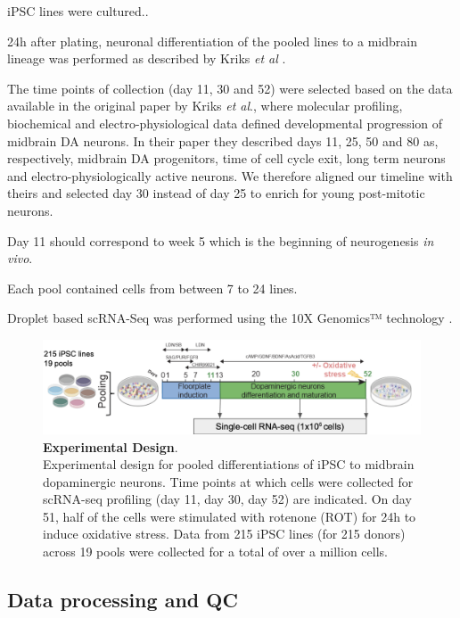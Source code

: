 iPSC lines were cultured..

24h after plating, neuronal differentiation of the pooled lines to a midbrain lineage was performed as described by Kriks \textit{et al} \cite{kriks2011dopamine}.

The time points of collection (day 11, 30 and 52) were selected based on the data available in the original paper by Kriks \textit{et al}., \cite{kriks2011dopamine} where molecular profiling, biochemical and electro-physiological data defined developmental progression of midbrain DA neurons. 
In their paper they described days 11, 25, 50 and 80 as, respectively, midbrain DA progenitors, time of cell cycle exit, long term neurons and electro-physiologically active neurons. 
We therefore aligned our timeline with theirs and selected day 30 instead of day 25 to enrich for young post-mitotic neurons. 


Day 11 should correspond to week 5 which is the beginning of neurogenesis \textit{in vivo}. 

Each pool contained cells from between 7 to 24 lines.

Droplet based scRNA-Seq was performed using the 10X Genomics™ technology \cite{zheng2017massively}.

\begin{figure}[h]
\centering
\includegraphics[width=16cm]{Chapter5/Fig/neuroseq_experimental_design.png}
\caption[Experimental Design]{\textbf{Experimental Design}.\\
Experimental design for pooled differentiations of iPSC to midbrain dopaminergic neurons. 
Time points at which cells were collected for scRNA-seq profiling (day 11, day 30, day 52) are indicated. 
On day 51, half of the cells were stimulated with rotenone (ROT) for 24h to induce oxidative stress.
Data from 215 iPSC lines (for 215 donors) across 19 pools were collected for a total of over a million cells.}
\label{fig:neuroseq_experimental_design}
\end{figure}

\subsection{Data processing and QC}


